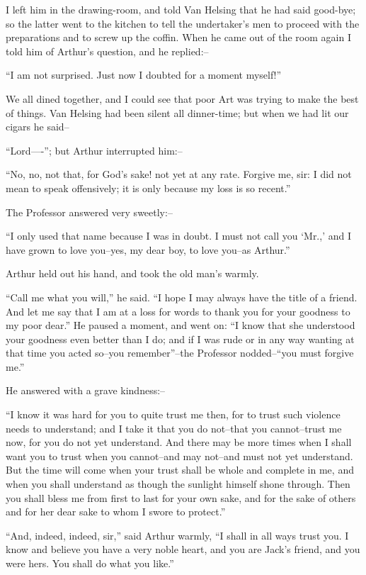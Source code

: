 \documentclass[12pt,openright]{book}
\begin{document}
I left him in the drawing-room, and told Van Helsing that he had said good-bye; so the latter went to the kitchen to tell the undertaker’s men to proceed with the preparations and to screw up the coffin. When he came out of the room again I told him of Arthur’s question, and he replied:–

“I am not surprised. Just now I doubted for a moment myself!”

We all dined together, and I could see that poor Art was trying to make the best of things. Van Helsing had been silent all dinner-time; but when we had lit our cigars he said–

“Lord—-”; but Arthur interrupted him:–

“No, no, not that, for God’s sake! not yet at any rate. Forgive me, sir: I did not mean to speak offensively; it is only because my loss is so recent.”

The Professor answered very sweetly:–

“I only used that name because I was in doubt. I must not call you ‘Mr.,’ and I have grown to love you–yes, my dear boy, to love you–as Arthur.”

Arthur held out his hand, and took the old man’s warmly.

“Call me what you will,” he said. “I hope I may always have the title of a friend. And let me say that I am at a loss for words to thank you for your goodness to my poor dear.” He paused a moment, and went on: “I know that she understood your goodness even better than I do; and if I was rude or in any way wanting at that time you acted so–you remember”–the Professor nodded–“you must forgive me.”

He answered with a grave kindness:–

“I know it was hard for you to quite trust me then, for to trust such violence needs to understand; and I take it that you do not–that you cannot–trust me now, for you do not yet understand. And there may be more times when I shall want you to trust when you cannot–and may not–and must not yet understand. But the time will come when your trust shall be whole and complete in me, and when you shall understand as though the sunlight himself shone through. Then you shall bless me from first to last for your own sake, and for the sake of others and for her dear sake to whom I swore to protect.”

“And, indeed, indeed, sir,” said Arthur warmly, “I shall in all ways trust you. I know and believe you have a very noble heart, and you are Jack’s friend, and you were hers. You shall do what you like.”
\end{document}
